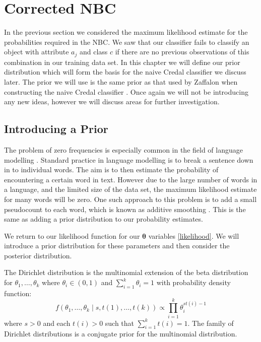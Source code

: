 \chapter{Corrected NBC}

In the previous section we considered the maximum likelihood estimate for the probabilities required in the NBC.
We saw that our classifier fails to classify an object with attribute $a_j$ and class $c$ if there are no previous observations of this combination in our training data set.
In this chapter we will define our prior distribution which will form the basis for the naive Credal classifier we discuss later.
The prior we will use is the same prior as that used by Zaffalon when constructing the naive Credal classifier \cite{Zaffalon01}.
Once again we will not be introducing any new ideas, however we will discuss areas for further investigation.

\section{Introducing a Prior}
The problem of zero frequencies is especially common in the field of language modelling \cite{Chen96}.
Standard practice in language modelling is to break a sentence down in to individual words.
The aim is to then estimate the probability of encountering a certain word in text.
However due to the large number of words in a language, and the limited size of the data set, the maximum likelihood estimate for many words will be zero.
One such approach to this problem is to add a small pseudocount to each word, which is known as additive smoothing \cite{Manning08}.
This is the same as adding a prior distribution to our probability estimates.

We return to our likelihood function for our $\bm{\theta}$ variables \cref{likelihood}.
We will introduce a prior distribution for these parameters and then consider the posterior distribution.

The Dirichlet distribution is the multinomial extension of the beta distribution for $\theta_1,\dots,\theta_k$ where $\theta_i \in (0,1)$ and $\sum_{i=1}^k \theta_i = 1$ with probability density function:
\begin{equation} \label{dirichlet_pdf}
	f(\theta_1,\dots,\theta_k \mid s, t(1),\dots,t(k)) \propto \prod_{i=1}^k \theta_i^{st(i) - 1}
\end{equation}
where $s > 0$ and each $t(i)>0$ such that $\sum_{i=1}^{k}t(i) = 1$.
The family of Dirichlet distributions is a conjugate prior for the multinomial distribution.

